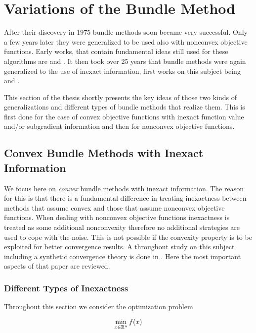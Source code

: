 \section{Variations of the Bundle Method}
\label{sec_simplifications}

After their discovery in 1975 bundle methods soon became very successful. Only a few years later they were generalized to be used also with nonconvex objective functions. Early works, that contain fundamental ideas still used for these algorithms are \cite{Mifflin1982} and \cite{Kiwiel1985}.
It then took over 25 years that bundle methods were again generalized to the use of inexact information, first works on this subject being \cite{Hintermueller2001,Kiwiel2006} and \cite{Solodov2003}.

This section of the thesis shortly presents the key ideas of those two kinds of generalizations and different types of bundle methods that realize them.
This is first done for the case of convex objective functions with inexact function value and/or subgradient information and then for nonconvex objective functions. 

\subsection{Convex Bundle Methods with Inexact Information}

We focus here on \emph{convex} bundle methods with inexact information. The reason for this is that there is a fundamental difference in treating inexactness between methods that assume convex and those that assume nonconvex objective functions.
When dealing with nonconvex objective functions inexactness is treated as some additional nonconvexity therefore no additional strategies are used to cope with the noise. This is not possible if the convexity property is to be exploited for better convergence results.
A throughout study on this subject including a synthetic convergence theory is done in \cite{Oliveira2014}. Here the most important aspects %
of that paper are reviewed.

\subsubsection{Different Types of Inexactness}

Throughout this section we consider the optimization problem

\begin{equation}
	\min_{x \in \mathbb{R}^n} f(x)
\label{opt_prob_conv}
\end{equation}

